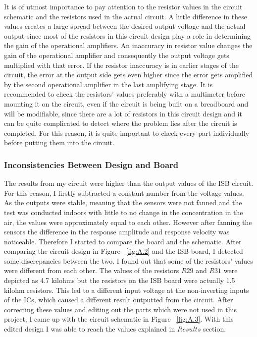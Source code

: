 It is of utmost importance to pay attention to the resistor values in the circuit schematic and the resistors used in the actual circuit. A little difference in these values creates a large spread between the desired output voltage and the actual output since most of the resistors in this circuit design play a role in determining the gain of the operational amplifiers. An inaccuracy in resistor value changes the gain of the operational amplifier and consequently the output voltage gets multiplied with that error. If the resistor inaccuracy is in earlier stages of the circuit, the error at the output side gets even higher since the error gets amplified by the second operational amplifier in the last amplifying stage. It is recommended to check the resistors' values preferably with a multimeter before mounting it on the circuit, even if the circuit is being built on a breadboard and will be modifiable, since there are a lot of resistors in this circuit design and it can be quite complicated to detect where the problem lies after the circuit is completed. For this reason, it is quite important to check every part individually before putting them into the circuit. \par 

\subsubsection{Inconsistencies Between Design and Board}
The results from my circuit were higher than the output values of the ISB circuit. For this reason, I firstly subtracted a constant number from the voltage values. As the outputs were stable, meaning that the sensors were not fanned and the test was conducted indoors with little to no change in the  concentration in the air, the values were approximately equal to each other. However after fanning the sensors the difference in the response amplitude and response velocity was noticeable. Therefore I started to compare the board and the schematic. After comparing the circuit design in Figure  ~\ref{fig:A.2} and the ISB board, I detected some discrepancies between the two. I found out that some of the resistors' values were different from each other. The values of the resistors $R29$ and $R31$ were depicted as 4.7 kilohms but the resistors on the ISB board were actually 1.5 kilohm resistors. This led to a different input voltage at the non-inverting inputs of the ICs, which caused a different result outputted from the circuit. After correcting these values and editing out the parts which were not used in this project, I came up with the circuit schematic in Figure  ~\ref{fig:A.3}. With this edited design I was able to reach the values explained in $Results$ section.